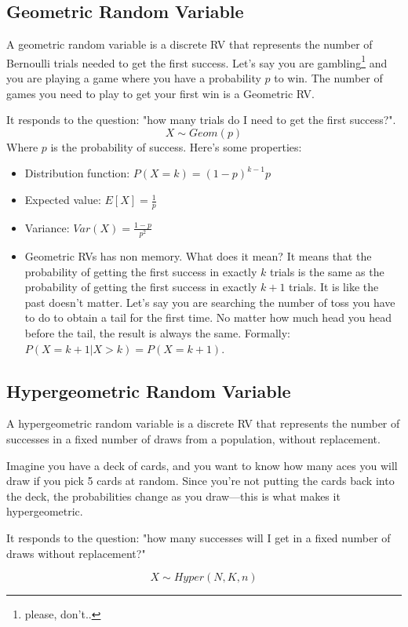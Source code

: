 \documentclass[a4paper]{article}
\begin{document}
\subsection{Geometric Random Variable}
A geometric random variable is a discrete RV that represents the number of Bernoulli trials needed to get the first success.
Let's say you are gambling\footnote{please, don't..} and you are playing a game where you have a probability $p$ to win. The number of games you need to play to get your first win is a Geometric RV.

It responds to the question: "how many trials do I need to get the first success?".
$$X \sim Geom(p)$$
Where $p$ is the probability of success. Here's some properties:
\begin{itemize}
    \item Distribution function: \( P(X = k) = (1 - p)^{k - 1}p \)
    \item Expected value: \( E[X] = \frac{1}{p} \)
    \item Variance: \( Var(X) = \frac{1 - p}{p^2} \)
    \item Geometric RVs has non memory. What does it mean? It means that the probability of getting the first success in exactly $k$ trials is the same as the probability of getting the first success in exactly $k + 1$ trials. It is like the past doesn't matter. Let's say you are searching the number of toss you have to do to obtain a tail for the first time. No matter how much head you head before the tail, the result is always the same. Formally: $P(X = k + 1 | X > k) = P(X = k + 1)$.
\end{itemize}

\subsection{Hypergeometric Random Variable}
A hypergeometric random variable is a discrete RV that represents the number of successes in a fixed number of draws from a population, without replacement. 

Imagine you have a deck of cards, and you want to know how many aces you will draw if you pick 5 cards at random. Since you're not putting the cards back into the deck, the probabilities change as you draw—this is what makes it hypergeometric.

It responds to the question: "how many successes will I get in a fixed number of draws without replacement?"

$$X \sim Hyper(N, K, n)$$
\end{document}
